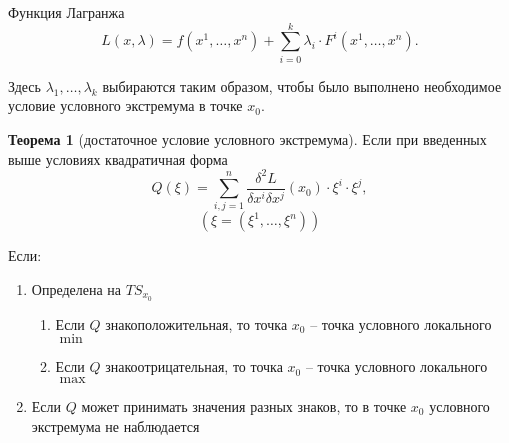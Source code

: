 \documentclass{report}
\theoremstyle{definition}
\newtheorem{theorem}{Теорема}[section]
\begin{document}
Функция Лагранжа
\begin{equation*}
  L(x,\lambda) = f(x^1,\ldots,x^n) + \sum_{i = 0}^{k}\lambda_i \cdot F^i(x^1,\ldots,x^n).
\end{equation*}

Здесь $\lambda_1,\ldots,\lambda_k$ выбираются таким образом, чтобы было выполнено необходимое условие условного экстремума в точке $x_0$.

\begin{theorem}[достаточное условие условного экстремума]
  Если при введенных выше условиях квадратичная форма
  \begin{equation*}
    Q(\xi) = \sum_{i,j=1}^{n}\frac{\delta^2 L}{\delta x^i \delta x^j}(x_0)\cdot\xi^i\cdot\xi^j,
  \end{equation*}
  \begin{equation*}
    (\xi=(\xi^1,\ldots,\xi^n))
  \end{equation*}

  Если:
  \begin{enumerate}
    \item Определена на $TS_{x_0}$
          \begin{enumerate}
            \item Если $Q$ знакоположительная, то точка $x_0$ -- точка условного локального $\min$
            \item Если $Q$ знакоотрицательная, то точка $x_0$ -- точка условного локального $\max$
          \end{enumerate}
    \item Если $Q$ может принимать значения разных знаков, то в точке $x_0$ условного экстремума не наблюдается
  \end{enumerate}
\end{theorem}
\end{document}
